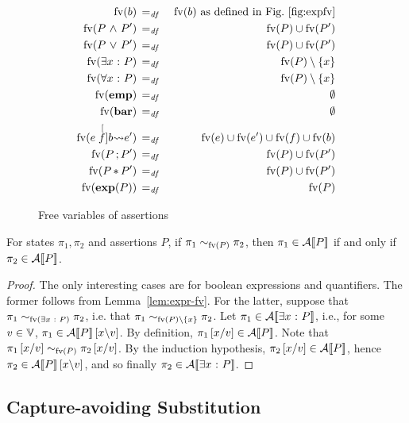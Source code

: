 \documentclass[11pt]{report}
\begin{document}
\begin{figure}[h]
	\centering
	\begin{eqnarray*}
		\fv{b} & \eqdef & \fv{b}\text{ as defined in Fig.~\ref{fig:expfv}} \\ 
		\fv{P \conj P'} & \eqdef & \fv{P} \cup \fv{P'} \\
		\fv{P \disj P'} & \eqdef & \fv{P} \cup \fv{P'} \\
		\fv{\exists x \st P} & \eqdef & \fv{P} \setminus \set{x} \\
		\fv{\forall x \st P} & \eqdef & \fv{P} \setminus \set{x} \\
		\fv{\emp} & \eqdef & \nil \\
		\fv{\barr} & \eqdef & \nil \\
		\fv{e \writeto{f}{b} e'} & \eqdef & \fv{e} \cup \fv{e'} \cup \fv{f} \cup \fv{b} \\
		\fv{P \seq P'} & \eqdef & \fv{P} \cup \fv{P'} \\
		\fv{P \sep P'} & \eqdef & \fv{P} \cup \fv{P'} \\
		\fv{\expand{P}} & \eqdef & \fv{P}
 	\end{eqnarray*}
	\caption{Free variables of assertions}
	\label{fig:assertion-fv}
\end{figure}


\begin{lemma}
	\label{lem:assertion-fv}
	For states $\pi_1, \pi_2$ and assertions $P$, if $\pi_1 \stcong{\fv{P}} \pi_2$, then $\pi_1 \in \dna{P}$ if and only if $\pi_2 \in \dna{P}$. 
\end{lemma}

\begin{proof}
	The only interesting cases are for boolean expressions and quantifiers. The former follows from Lemma~\ref{lem:expr-fv}. For the latter, suppose that $\pi_1 \stcong{\fv{\exists x \st P}} \pi_2$, i.e. that $\pi_1 \stcong{\fv{P} \setminus \set{x}} \pi_2$. Let $\pi_1 \in \dna{\exists x \st P}$, i.e., for some $v \in \setvalues$, $\pi_1 \in \dna{P}\unsubst{x}{v}$. By definition, $\pi_1 \subst{x}{v} \in \dna{P}$. Note that $\pi_1 \subst{x}{v} \stcong{\fv{P}} \pi_2 \subst{x}{v}$. By the induction hypothesis, $\pi_2 \subst{x}{v} \in \dna{P}$, hence $\pi_2 \in \dna{P}\unsubst{x}{v}$, and so finally $\pi_2 \in \dna{\exists x \st P}$. 
\end{proof}



\subsection{Capture-avoiding Substitution} %
\label{sub:capture_avoiding_substitution}
\end{document}
